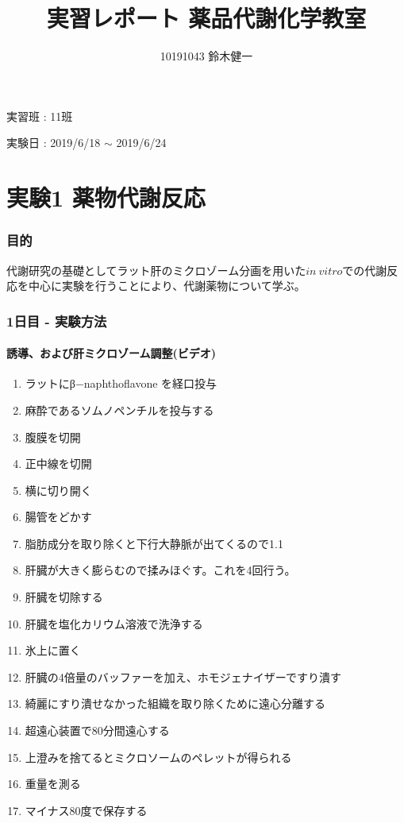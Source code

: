 \documentclass[a4paper,papersize,dvipdfmx]{jsarticle}
\begin{document}
\title{実習レポート 薬品代謝化学教室}
\author{10191043 鈴木健一}
\date{}
\maketitle



\begin{flushright}
実習班 : 11班 

実験日 : 2019/6/18 $\sim$ 2019/6/24
\end{flushright}

\part*{実験1 薬物代謝反応}

\section*{目的}
代謝研究の基礎としてラット肝のミクロゾーム分画を用いた$in \ vitro$での代謝反応を中心に実験を行うことにより、代謝薬物について学ぶ。

\section*{1日目 - 実験方法}

\subsection*{誘導、および肝ミクロゾーム調整(ビデオ)}
\begin{enumerate}
\item ラットにβ−naphthoflavone を経口投与
\item 麻酔であるソムノペンチルを投与する
\item 腹膜を切開
\item 正中線を切開
\item 横に切り開く
\item 腸管をどかす
\item 脂肪成分を取り除くと下行大静脈が出てくるので1.1%
\item 肝臓が大きく膨らむので揉みほぐす。これを4回行う。
\item 肝臓を切除する
\item 肝臓を塩化カリウム溶液で洗浄する
\item 氷上に置く
\item 肝臓の4倍量のバッファーを加え、ホモジェナイザーですり潰す
\item 綺麗にすり潰せなかった組織を取り除くために遠心分離する
\item 超遠心装置で80分間遠心する
\item 上澄みを捨てるとミクロソームのペレットが得られる
\item 重量を測る
\item マイナス80度で保存する

\end{enumerate}
\end{document}
